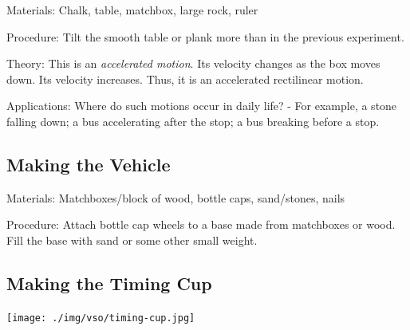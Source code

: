 \begin{multicols}{2}
\begin{description*}
\item[Materials:]{Chalk, table, matchbox, large rock, ruler}
\item[Procedure:]{Tilt the smooth table or plank more than in the previous experiment.}
\item[Theory:]{This is an \emph{accelerated motion}. Its velocity changes as the box moves down. Its
velocity increases. Thus, it is an accelerated rectilinear motion.}
\item[Applications:]{Where do such motions occur in daily life? - For example, a stone falling down; a bus
accelerating after the stop; a bus breaking before a stop.}
\end{description*}

\subsection{Making the Vehicle}

\begin{description*}
\item[Materials:]{Matchboxes/block of wood, bottle caps, sand/stones, nails}
\item[Procedure:]{Attach bottle cap wheels to a base made from matchboxes or wood. Fill the base with sand or some other small weight.}
\end{description*}

\subsection{Making the Timing Cup}

\begin{center}
\texttt{[image: ./img/vso/timing-cup.jpg]}
\end{center}


\end{multicols}
